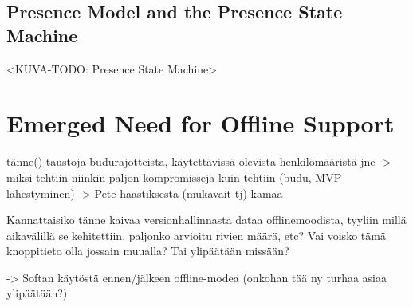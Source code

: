 \subsection{Presence Model and the Presence State Machine}


<KUVA-TODO: Presence State Machine>




\section{Emerged Need for Offline Support}
tänne() taustoja budurajotteista, käytettävissä olevista henkilömääristä jne 
-> miksi tehtiin niinkin paljon kompromisseja kuin tehtiin (budu, MVP-lähestyminen)
-> Pete-haastiksesta (mukavait tj) kamaa


Kannattaisiko tänne kaivaa versionhallinnasta dataa offlinemoodista, tyyliin millä aikavälillä se kehitettiin, paljonko arvioitu rivien määrä, etc? Vai voisko tämä knoppitieto olla jossain muualla? Tai ylipäätään missään?


-> Softan käytöstä ennen/jälkeen offline-modea (onkohan tää ny turhaa asiaa ylipäätään?)










